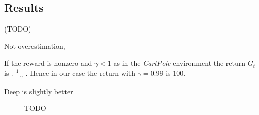 \subsection{Results}

(TODO)


Not overestimation, 

If the reward is nonzero and $\gamma < 1$ as in the \textit{CartPole} environment the return $G_t$ is $\frac{1}{1 - \gamma}$ \cite{Sutton:1998:IRL:551283}. Hence in our case the return with $\gamma = 0.99$ is $100$.


Deep is slightly better

% 


\begin{figure*}[t]
	\centering
	
	\caption{TODO}
	\label{fig:subfig}
\end{figure*}